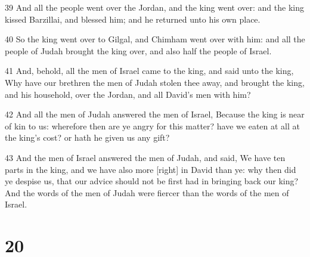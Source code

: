 \par 39 And all the people went over the Jordan, and the king went over: and the king kissed Barzillai, and blessed him; and he returned unto his own place.
\par 40 So the king went over to Gilgal, and Chimham went over with him: and all the people of Judah brought the king over, and also half the people of Israel.
\par 41 And, behold, all the men of Israel came to the king, and said unto the king, Why have our brethren the men of Judah stolen thee away, and brought the king, and his household, over the Jordan, and all David's men with him?
\par 42 And all the men of Judah answered the men of Israel, Because the king is near of kin to us: wherefore then are ye angry for this matter? have we eaten at all at the king's cost? or hath he given us any gift?
\par 43 And the men of Israel answered the men of Judah, and said, We have ten parts in the king, and we have also more [right] in David than ye: why then did ye despise us, that our advice should not be first had in bringing back our king? And the words of the men of Judah were fiercer than the words of the men of Israel.

\chapter{20}

